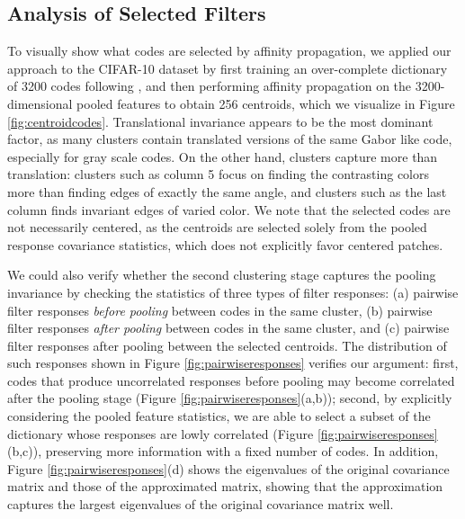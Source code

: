 \subsection{Analysis of Selected Filters}\label{subsec:sizematters:visualization}
To visually show what codes are selected by affinity propagation, we applied our approach to the CIFAR-10 dataset by first training an over-complete dictionary of 3200 codes following \cite{coates2011icml}, and then performing affinity propagation on the 3200-dimensional pooled features to obtain 256 centroids, which we visualize in Figure \ref{fig:centroidcodes}. Translational invariance appears to be the most dominant factor, as many clusters contain translated versions of the same Gabor like code, especially for gray scale codes. On the other hand, clusters capture more than translation: clusters such as column 5 focus on finding the contrasting colors more than finding edges of exactly the same angle, and clusters such as the last column finds invariant edges of varied color. We note that the selected codes are not necessarily centered, as the centroids are selected solely from the pooled response covariance statistics, which does not explicitly favor centered patches.

We could also verify whether the second clustering stage captures the pooling invariance by checking the statistics of three types of filter responses: (a) pairwise filter responses \emph{before pooling} between codes in the same cluster, (b) pairwise filter responses \emph{after pooling} between codes in the same cluster, and (c) pairwise filter responses after pooling between the selected centroids. The distribution of such responses shown in Figure \ref{fig:pairwiseresponses} verifies our argument: first, codes that produce uncorrelated responses before pooling may become correlated after the pooling stage (Figure \ref{fig:pairwiseresponses}(a,b)); second, by explicitly considering the pooled feature statistics, we are able to select a subset of the dictionary whose responses are lowly correlated (Figure \ref{fig:pairwiseresponses}(b,c)), preserving more information with a fixed number of codes. In addition, Figure \ref{fig:pairwiseresponses}(d) shows the eigenvalues of the original covariance matrix and those of the approximated matrix, showing that the approximation captures the largest eigenvalues of the original covariance matrix well.

